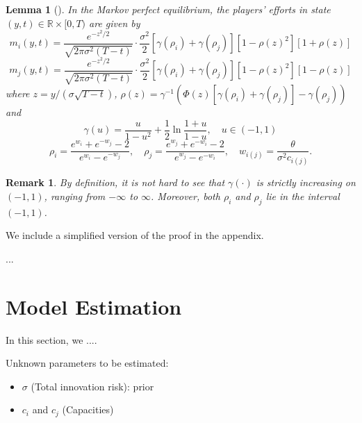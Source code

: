 \documentclass[a4paper, 11pt]{article}
\theoremstyle{plain} %
\newtheorem{lemma}{Lemma}
\newtheorem{remark}{Remark}
\begin{document}
\begin{lemma}[\citealt{ryvkin2022fight}]
In the Markov perfect equilibrium, the players’ efforts in state $(y, t) \in\mathbb{R}\times[0, T)$ are given by
\begin{equation*}
m_{i}(y, t) = \frac{e^{-z^2/2}}{\sqrt{2\pi\sigma^2(T-t)}}\cdot \frac{\sigma^2}{2}\left[\gamma(\rho_{i}) + \gamma(\rho_{j})\right]\left[1-\rho(z)^2\right]\left[1 + \rho(z)\right]
\end{equation*}
\begin{equation*}
m_{j}(y, t) = \frac{e^{-z^2/2}}{\sqrt{2\pi\sigma^2(T-t)}}\cdot \frac{\sigma^2}{2}
 \left[\gamma(\rho_{i}) + \gamma(\rho_{j})\right]\left[1-\rho(z)^2\right]\left[1 - \rho(z)\right]
\end{equation*}
where $z = y / (\sigma\sqrt{T-t})$, $\rho(z) = \gamma^{-1}\left(\Phi(z)\left[\gamma(\rho_{i})+\gamma(\rho_{j})\right]-\gamma(\rho_{j})\right)$ and 
\begin{equation*}
\gamma(u) = \frac{u}{1-u^2} + \frac{1}{2}\ln\frac{1+u}{1-u},\quad u\in(-1,1)
\end{equation*}
\begin{equation*}
\rho_{i} = \frac{e^{w_{i}}+e^{-w_{j}}-2}{e^{w_{i}}-e^{-w_{j}}},
\quad
\rho_{j} = \frac{e^{w_{j}}+e^{-w_{i}}-2}{e^{w_{j}}-e^{-w_{i}}},
\quad
w_{i(j)} = \frac{\theta}{\sigma^2 c_{i(j)}}.
\end{equation*}
\end{lemma}

\begin{remark}
By definition, it is not hard to see that $\gamma(\cdot)$ is strictly increasing on $(-1,1)$, ranging from $-\infty$ to $\infty$. 
Moreover, both $\rho_i$ and $\rho_j$ lie in the interval $(-1,1)$. 
\end{remark}

We include a simplified version of the proof in the appendix.

...


\section{Model Estimation}

In this section, we ....

Unknown parameters to be estimated: 
\begin{itemize}
	\item $\sigma$ (Total innovation risk): prior 
	\item $c_i$ and $c_j$ (Capacities)
\end{itemize}
\end{document}
